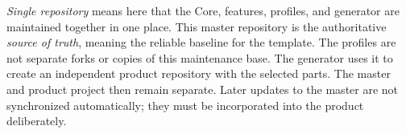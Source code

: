 \begin{beginnerstatement}

\emph{Single repository} means here that the Core, features, profiles, and
generator are maintained together in one place. This master repository is the
authoritative \emph{source of truth}, meaning the reliable baseline for the
template. The profiles are not separate forks or copies of this maintenance
base. The generator uses it to create an independent product repository with
the selected parts. The master and product project then remain separate.
Later updates to the master are not synchronized automatically; they must be
incorporated into the product deliberately.

\end{beginnerstatement}
